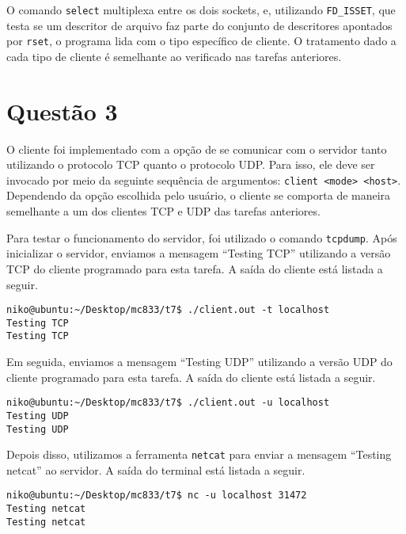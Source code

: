 \documentclass[a4paper,10pt]{article}
\begin{document}
O comando {\tt select} multiplexa entre os dois sockets, e, utilizando {\tt FD\_ISSET}, que testa se um descritor de arquivo faz parte do conjunto de descritores apontados por {\tt rset}, o programa lida com o tipo específico de cliente. O tratamento dado a cada tipo de cliente é semelhante ao verificado nas tarefas anteriores.

\section{Questão 3}

O cliente foi implementado com a opção de se comunicar com o servidor tanto utilizando o protocolo TCP quanto o protocolo UDP. Para isso, ele deve ser invocado por meio da seguinte sequência de argumentos: {\tt client <mode> <host>}.\\

Dependendo da opção escolhida pelo usuário, o cliente se comporta de maneira semelhante a um dos clientes TCP e UDP das tarefas anteriores.

Para testar o funcionamento do servidor, foi utilizado o comando {\tt tcpdump}. Após inicializar o servidor, enviamos a mensagem ``Testing TCP'' utilizando a versão TCP do cliente programado para esta tarefa. A saída do cliente está listada a seguir.

\begin{lstlisting}
niko@ubuntu:~/Desktop/mc833/t7$ ./client.out -t localhost
Testing TCP
Testing TCP

\end{lstlisting}


Em seguida, enviamos a mensagem ``Testing UDP'' utilizando a versão UDP do cliente programado para esta tarefa. A saída do cliente está listada a seguir.

\begin{lstlisting}
niko@ubuntu:~/Desktop/mc833/t7$ ./client.out -u localhost
Testing UDP
Testing UDP

\end{lstlisting}

Depois disso, utilizamos a ferramenta {\tt netcat} para enviar a mensagem ``Testing netcat'' ao servidor. A saída do terminal está listada a seguir.

\begin{lstlisting}
niko@ubuntu:~/Desktop/mc833/t7$ nc -u localhost 31472
Testing netcat
Testing netcat

\end{lstlisting}
\end{document}
